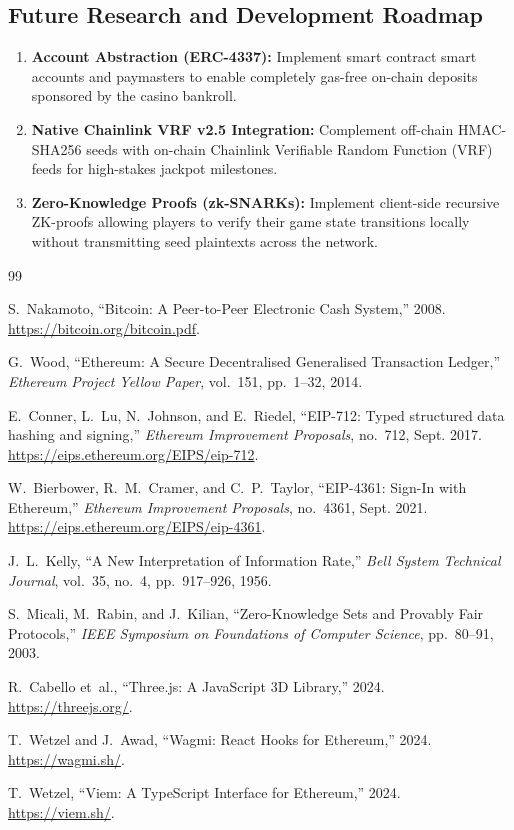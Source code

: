 \subsection{Future Research and Development Roadmap}
\begin{enumerate}[leftmargin=1.5em]
    \item \textbf{Account Abstraction (ERC-4337):} Implement smart contract smart accounts and paymasters to enable completely gas-free on-chain deposits sponsored by the casino bankroll.
    \item \textbf{Native Chainlink VRF v2.5 Integration:} Complement off-chain HMAC-SHA256 seeds with on-chain Chainlink Verifiable Random Function (VRF) feeds for high-stakes jackpot milestones.
    \item \textbf{Zero-Knowledge Proofs (zk-SNARKs):} Implement client-side recursive ZK-proofs allowing players to verify their game state transitions locally without transmitting seed plaintexts across the network.
\end{enumerate}

\newpage
\begin{thebibliography}{99}

S.~Nakamoto, ``Bitcoin: A Peer-to-Peer Electronic Cash System,'' 2008. \url{https://bitcoin.org/bitcoin.pdf}.

G.~Wood, ``Ethereum: A Secure Decentralised Generalised Transaction Ledger,'' \textit{Ethereum Project Yellow Paper}, vol.~151, pp.~1--32, 2014.

E.~Conner, L.~Lu, N.~Johnson, and E.~Riedel, ``EIP-712: Typed structured data hashing and signing,'' \textit{Ethereum Improvement Proposals}, no.~712, Sept. 2017. \url{https://eips.ethereum.org/EIPS/eip-712}.

W.~Bierbower, R.~M.~Cramer, and C.~P.~Taylor, ``EIP-4361: Sign-In with Ethereum,'' \textit{Ethereum Improvement Proposals}, no.~4361, Sept. 2021. \url{https://eips.ethereum.org/EIPS/eip-4361}.

J.~L.~Kelly, ``A New Interpretation of Information Rate,'' \textit{Bell System Technical Journal}, vol.~35, no.~4, pp.~917--926, 1956.

S.~Micali, M.~Rabin, and J.~Kilian, ``Zero-Knowledge Sets and Provably Fair Protocols,'' \textit{IEEE Symposium on Foundations of Computer Science}, pp.~80--91, 2003.

R.~Cabello et~al., ``Three.js: A JavaScript 3D Library,'' 2024. \url{https://threejs.org/}.

T.~Wetzel and J.~Awad, ``Wagmi: React Hooks for Ethereum,'' 2024. \url{https://wagmi.sh/}.

T.~Wetzel, ``Viem: A TypeScript Interface for Ethereum,'' 2024. \url{https://viem.sh/}.

\end{thebibliography}

